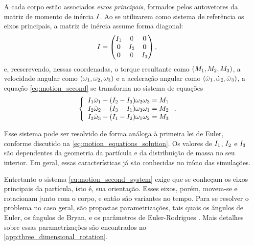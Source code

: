 A cada corpo estão associados \textit{eixos principais}, formados pelos autovetores da matriz de momento de inércia \(I\). Ao se utilizarem como sistema de referência os eixos principais, a matriz de inércia assume forma diagonal:
\begin{equation*}
	I =
	\begin{pmatrix}
		I_1 & 0 & 0 \\
		0 & I_2 & 0 \\
		0 & 0 & I_3 \\
	\end{pmatrix},
\end{equation*}
e, reescrevendo, nessas coordenadas, o torque resultante como \(\explicitVectorPrincipalCoordinates{\torqueScalar}\), a velocidade angular como \(\explicitVectorPrincipalCoordinates{\angularVelocityScalar}\) e a aceleração angular como \(\explicitVectorPrincipalCoordinates{\deriv{1}{\angularVelocityScalar}}\), a equação \eqref{eq:motion_second} se transforma no sistema de equações
\begin{equation} \label{eq:motion_second_system}
	\left\lbrace
	\begin{array}{l}
		\momentOfInertia_1\deriv{1}{\angularVelocityScalar}_1 - \pqty{\momentOfInertia_2 - \momentOfInertia_3}\angularVelocityScalar_2\angularVelocityScalar_3 = \torqueScalar_1 \\
		\momentOfInertia_2\deriv{1}{\angularVelocityScalar}_2 - \pqty{\momentOfInertia_3 - \momentOfInertia_1}\angularVelocityScalar_3\angularVelocityScalar_1 = \torqueScalar_2 \\
		\momentOfInertia_3\deriv{1}{\angularVelocityScalar}_3 - \pqty{\momentOfInertia_1 - \momentOfInertia_2}\angularVelocityScalar_1\angularVelocityScalar_2 = \torqueScalar_3
	\end{array}
	\right.
	.
\end{equation}

Esse sistema pode ser resolvido de forma análoga à primeira lei de Euler, conforme discutido na \autoref{eq:motion_equations_solution}. Os valores de \(I_1\), \(I_2\) e \(I_3\) são dependentes da geometria da partícula e da distribuição de massa no seu interior. Em geral, essas características já são conhecidas no início das simulações.

Entretanto o sistema \eqref{eq:motion_second_system} exige que se conheçam os eixos principais da partícula, isto é, sua orientação. Esses eixos, porém, movem-se e rotacionam junto com o corpo, e então são variantes no tempo. Para se resolver o problema no caso geral, são propostas parametrizações, tais quais os ângulos de Euler, os ângulos de Bryan, e os parâmetros de Euler-Rodrigues \cite{bib:dynamics_of_multibody_systems}. Mais detalhes sobre essas parametrizações são encontrados no \autoref{app:three_dimensional_rotation}.

